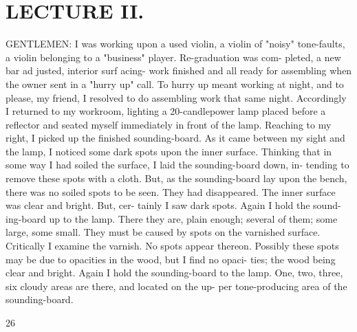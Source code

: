 \documentclass{article}
\begin{document}
\section*{LECTURE II.}
GENTLEMEN: I was working upon a used violin, a violin of "noisy" tone-faults, a violin belonging to a "business" player. Re-graduation was com- pleted, a new bar ad justed, interior surf acing- work finished and all ready for assembling when the owner sent in a "hurry up" call. To hurry up meant working at night, and to please, my friend, I resolved to do assembling work that same night. Accordingly I returned to my workroom, lighting a 20-candlepower lamp placed before a reflector and seated myself immediately in front of the lamp. Reaching to my right, I picked up the finished sounding-board. As it came between my sight and the lamp, I noticed some dark spots upon the inner surface. Thinking that in some way I had soiled the surface, I laid the sounding-board down, in- tending to remove these spots with a cloth. But, as the sounding-board lay upon the bench, there was no soiled spots to be seen. They had disappeared. The inner surface was clear and bright. But, cer- tainly I saw dark spots. Again I hold the sound- ing-board up to the lamp. There they are, plain enough; several of them; some large, some small. They must be caused by spots on the varnished surface. Critically I examine the varnish. No spots appear thereon. Possibly these spots may be due to opacities in the wood, but I find no opaci- ties; the wood being clear and bright. Again I hold the sounding-board to the lamp. One, two, three, six cloudy areas are there, and located on the up- per tone-producing area of the sounding-board.

26
\end{document}
